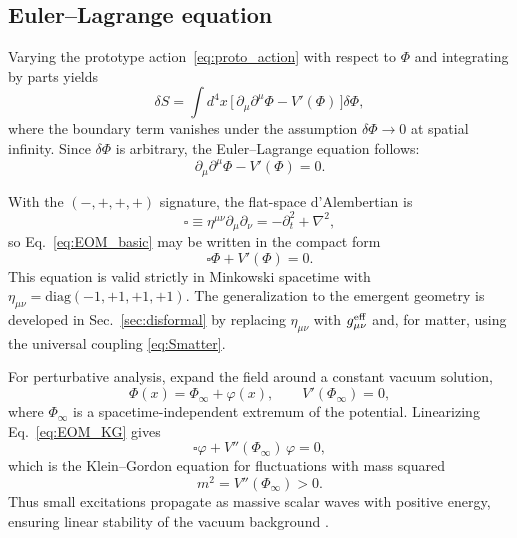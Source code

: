 \documentclass{article}
\begin{document}
\subsection{Euler–Lagrange equation}

Varying the prototype action~\eqref{eq:proto_action} with respect to $\Phi$ and integrating by parts yields
\begin{equation}
\delta S = \int d^{4}x \,\big[\, \partial_{\mu}\partial^{\mu}\Phi - V'(\Phi)\,\big]\delta\Phi ,
\end{equation}
where the boundary term vanishes under the assumption $\delta\Phi \to 0$ at spatial infinity. Since $\delta\Phi$ is arbitrary, the Euler–Lagrange equation follows:
\begin{equation}
\partial_{\mu}\partial^{\mu}\Phi - V'(\Phi) = 0 .
\label{eq:EOM_basic}
\end{equation}

With the $(-,+,+,+)$ signature, the flat-space d’Alembertian is
\begin{equation}
\square \equiv \eta^{\mu\nu}\partial_{\mu}\partial_{\nu} = -\partial_{t}^{2} + \nabla^{2},
\end{equation}
so Eq.~\eqref{eq:EOM_basic} may be written in the compact form
\begin{equation}
\square \Phi + V'(\Phi) = 0 .
\label{eq:EOM_KG}
\end{equation}
This equation is valid strictly in Minkowski spacetime with $\eta_{\mu\nu}=\mathrm{diag}(-1,+1,+1,+1)$. The generalization to the emergent geometry is developed in Sec.~\ref{sec:disformal} by replacing $\eta_{\mu\nu}$ with $g^{\rm eff}_{\mu\nu}$ and, for matter, using the universal coupling \eqref{eq:Smatter}.

For perturbative analysis, expand the field around a constant vacuum solution,
\begin{equation}
\Phi(x) = \Phi_{\infty} + \varphi(x), 
\qquad V'(\Phi_{\infty}) = 0 ,
\end{equation}
where $\Phi_{\infty}$ is a spacetime-independent extremum of the potential. Linearizing Eq.~\eqref{eq:EOM_KG} gives
\begin{equation}
\square \varphi + V''(\Phi_{\infty})\,\varphi = 0 ,
\end{equation}
which is the Klein–Gordon equation for fluctuations with mass squared
\begin{equation}
m^{2} = V''(\Phi_{\infty}) > 0 .
\end{equation}
Thus small excitations propagate as massive scalar waves with positive energy, ensuring linear stability of the vacuum background \cite{Peskin1995,Weinberg1995,Ryder1996,Birrell1982}.
\end{document}
